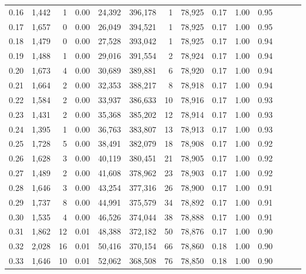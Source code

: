 \begin{tabular}{rrrrrrrrrrrrrr}
0.16 &   1,442 &      1 &  0.00 &   24,392 &  396,178 &       1 &  78,925 &  0.17 &  1.00 &      0.95 \\
0.17 &   1,657 &      0 &  0.00 &   26,049 &  394,521 &       1 &  78,925 &  0.17 &  1.00 &      0.95 \\
0.18 &   1,479 &      0 &  0.00 &   27,528 &  393,042 &       1 &  78,925 &  0.17 &  1.00 &      0.94 \\
0.19 &   1,488 &      1 &  0.00 &   29,016 &  391,554 &       2 &  78,924 &  0.17 &  1.00 &      0.94 \\
0.20 &   1,673 &      4 &  0.00 &   30,689 &  389,881 &       6 &  78,920 &  0.17 &  1.00 &      0.94 \\
0.21 &   1,664 &      2 &  0.00 &   32,353 &  388,217 &       8 &  78,918 &  0.17 &  1.00 &      0.94 \\
0.22 &   1,584 &      2 &  0.00 &   33,937 &  386,633 &      10 &  78,916 &  0.17 &  1.00 &      0.93 \\
0.23 &   1,431 &      2 &  0.00 &   35,368 &  385,202 &      12 &  78,914 &  0.17 &  1.00 &      0.93 \\
0.24 &   1,395 &      1 &  0.00 &   36,763 &  383,807 &      13 &  78,913 &  0.17 &  1.00 &      0.93 \\
0.25 &   1,728 &      5 &  0.00 &   38,491 &  382,079 &      18 &  78,908 &  0.17 &  1.00 &      0.92 \\
0.26 &   1,628 &      3 &  0.00 &   40,119 &  380,451 &      21 &  78,905 &  0.17 &  1.00 &      0.92 \\
0.27 &   1,489 &      2 &  0.00 &   41,608 &  378,962 &      23 &  78,903 &  0.17 &  1.00 &      0.92 \\
0.28 &   1,646 &      3 &  0.00 &   43,254 &  377,316 &      26 &  78,900 &  0.17 &  1.00 &      0.91 \\
0.29 &   1,737 &      8 &  0.00 &   44,991 &  375,579 &      34 &  78,892 &  0.17 &  1.00 &      0.91 \\
0.30 &   1,535 &      4 &  0.00 &   46,526 &  374,044 &      38 &  78,888 &  0.17 &  1.00 &      0.91 \\
0.31 &   1,862 &     12 &  0.01 &   48,388 &  372,182 &      50 &  78,876 &  0.17 &  1.00 &      0.90 \\
0.32 &   2,028 &     16 &  0.01 &   50,416 &  370,154 &      66 &  78,860 &  0.18 &  1.00 &      0.90 \\
0.33 &   1,646 &     10 &  0.01 &   52,062 &  368,508 &      76 &  78,850 &  0.18 &  1.00 &      0.90 \\

\end{tabular}
